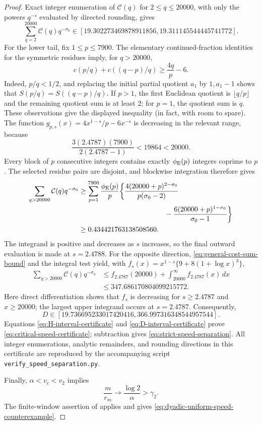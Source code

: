 \begin{proof}
Exact integer enumeration of \(\mathcal C(q)\) for \(2\le q\le20000\), with
only the powers \(q^{-s}\) evaluated by directed rounding, gives
\[
 \sum_{q=2}^{20000}\mathcal C(q)q^{-\sigma_0}
 \in[19.302273469878911856,19.311145544445741772].
\]
For the lower tail, fix \(1\le p\le7900\).  The elementary continued-fraction
identities for the symmetric residues imply, for \(q>20000\),
\[
 c(p/q)+c((q-p)/q)\ge\frac{4q}{p}-6.
\]
Indeed, \(p/q<1/2\), and replacing the initial partial quotient \(a_1\)
by \(1,a_1-1\) shows that \(S(p/q)=S((q-p)/q)\).  If \(p>1\), the first
Euclidean quotient is \(\lfloor q/p\rfloor\) and the remaining quotient sum
is at least \(2\); for \(p=1\), the quotient sum is \(q\).  These observations
give the displayed inequality (in fact, with room to spare).
The function
\(g_{p,s}(x)=4x^{1-s}/p-6x^{-s}\) is decreasing in the relevant range,
because
\[
 \frac{3(2.4787)(7900)}{2(2.4787-1)}<19864<20000.
\]
Every block of \(p\) consecutive integers contains exactly
\(\phi_{\rm E}(p)\) integers coprime to \(p\).  The selected residue pairs
are disjoint, and blockwise integration therefore gives
\[
 \begin{aligned}
 \sum_{q>20000}\mathcal C(q)q^{-\sigma_0}
 &\ge\sum_{p=1}^{7900}\frac{\phi_{\rm E}(p)}p
 \bigg\{\frac{4(20000+p)^{2-\sigma_0}}
                 {p(\sigma_0-2)}\\
 &\hspace{43mm}
 -\frac{6(20000+p)^{1-\sigma_0}}{\sigma_0-1}\bigg\}\\
 &\ge0.434421763138508560.
 \end{aligned}
\]
The integrand is positive and decreases as \(s\) increases, so the final
outward evaluation is made at \(s=2.4788\).
For the opposite direction, \eqref{eq:general-cost-sum-bound} and the
integral test yield, with
\(f_s(x)=x^{1-s}\{9+8(1+\log x)^3\}\),
\[
 \begin{aligned}
 \sum_{q>20000}\mathcal C(q)q^{-\sigma_0}
 &\le f_{2.4787}(20000)
       +\int_{20000}^{\infty}f_{2.4787}(x)\,dx\\
 &\le347.686170804099215772.
 \end{aligned}
\]
Here direct differentiation shows that \(f_s\) is decreasing for
\(s\ge2.4787\) and \(x\ge20000\); the largest upper integrand occurs at
\(s=2.4787\).
Consequently,
\begin{equation}
 D\in[19.736695233017420416,366.997316348544957544].
 \label{eq:D-interval-certificate}
\end{equation}
Equations \eqref{eq:H-interval-certificate} and
\eqref{eq:D-interval-certificate} prove
\eqref{eq:critical-speed-certificate}; subtraction gives
\eqref{eq:strict-speed-separation}.  All integer enumerations, analytic
remainders, and rounding directions in this certificate are reproduced by
the accompanying script \texttt{verify\_speed\_separation.py}.

Finally, \(\alpha<v_c<v_2\) implies
\[
 \frac{m}{r_m}\longrightarrow\frac{\log2}{\alpha}>\gamma_2.
\]
The finite-window assertion of  applies and
gives \eqref{eq:dyadic-uniform-speed-counterexample}.
\end{proof}


